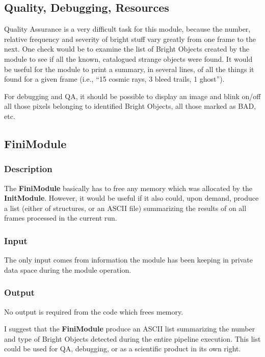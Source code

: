 \subsection{Quality, Debugging, Resources}


  Quality Assurance is a very difficult task for this
module, because the number, relative frequency and
severity of bright stuff vary greatly from one
frame to the next.  One check would be to examine the
list of Bright Objects created by the module to see
if all the known, catalogued strange objects were
found.  It would be useful for the module to print
a summary, in several lines, of all the things it
found for a given frame (i.e., ``15 cosmic rays,
3 bleed trails, 1 ghost'').

  For debugging and QA, it should be possible to
display an image and blink on/off all those pixels
belonging to identified Bright Objects, all those
marked as BAD, etc.

\subsection {FiniModule}

\subsubsection {Description}

  The {\bf FiniModule} basically has to free any memory
which was allocated by the {\bf InitModule}.  However,
it would be useful if it also could, upon demand,
produce a list (either of structures, or an ASCII file)
summarizing the results of \bom on all frames processed
in the current run.

\subsubsection {Input}

  The only input comes from information the module
has been keeping in private data space during the
module operation.

\subsubsection {Output}

  No output is required from the code which frees memory.

  I suggest that the {\bf FiniModule} produce an ASCII
list summarizing the number and type of Bright Objects
detected during the entire pipeline execution.
This list could be used for QA, debugging, or as a
scientific product in its own right.

